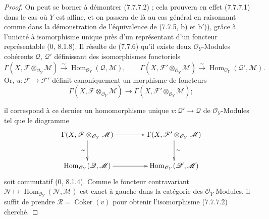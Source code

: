 \begin{proof}
On peut se borner à démontrer (7.7.7.2) ; cela prouvera en effet (7.7.7.1)
dans le cas où $Y$ est affine, et on passera de là au cas général en raisonnant
comme dans la démonstration de l'équivalence de (7.7.5, b) et b$'$)), grâce à
l'unicité à isomorphisme unique près d'un représentant d'un foncteur
représentable (0, 8.1.8). Il résulte de (7.7.6) qu'il existe deux
$\mathscr O_Y$-Modules cohérents $\mathscr Q$, $\mathscr Q'$ définissant des
isomorphismes fonctoriels
\[
  \Gamma(X,\mathscr F\otimes_{\mathscr O_Y}\mathscr M)
  \xrightarrow{\sim}
  \operatorname{Hom}_{\mathscr O_Y}(\mathscr Q,\mathscr M),
  \qquad
  \Gamma(X,\mathscr F'\otimes_{\mathscr O_Y}\mathscr M)
  \xrightarrow{\sim}
  \operatorname{Hom}_{\mathscr O_Y}(\mathscr Q',\mathscr M).
\]
Or, $u:\mathscr F\to\mathscr F'$ définit canoniquement un morphisme de foncteurs
\[
  \Gamma(X,\mathscr F\otimes_{\mathscr O_Y}\mathscr M)
  \longrightarrow
  \Gamma(X,\mathscr F'\otimes_{\mathscr O_Y}\mathscr M);
\]

il correspond à ce dernier un homomorphisme unique
$v:\mathscr Q'\to\mathscr Q$ de $\mathscr O_Y$-Modules tel que le diagramme
\[
\xymatrix@C=42pt@R=28pt{
  \Gamma(X,\mathscr F\otimes_{\mathscr O_Y}\mathscr M)
    \ar[r]\ar[d]_-{\sim}
  &
  \Gamma(X,\mathscr F'\otimes_{\mathscr O_Y}\mathscr M)
    \ar[d]^-{\sim}
  \\
  \operatorname{Hom}_{\mathscr O_Y}(\mathscr Q,\mathscr M)
    \ar[r]
  &
  \operatorname{Hom}_{\mathscr O_Y}(\mathscr Q',\mathscr M)
}
\]
soit commutatif (0, 8.1.4). Comme le foncteur contravariant
$\mathscr N\mapsto\operatorname{Hom}_{\mathscr O_Y}(\mathscr N,\mathscr M)$ est
exact à gauche dans la catégorie des $\mathscr O_Y$-Modules, il suffit de prendre
$\mathscr R=\operatorname{Coker}(v)$ pour obtenir l'isomorphisme (7.7.7.2)
cherché.
\end{proof}

